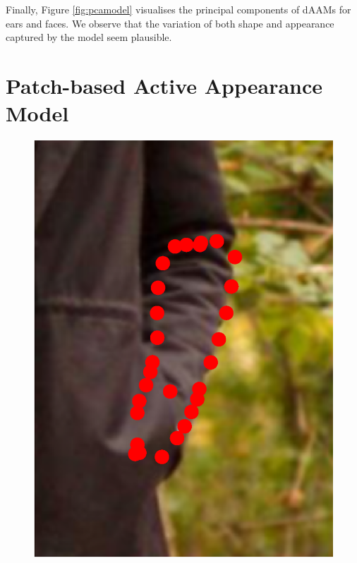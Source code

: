 Finally, Figure \ref{fig:pcamodel} visualises the principal components of dAAMs for ears and faces. We observe that the variation of both shape and appearance captured by the model seem plausible.














\section{Patch-based Active Appearance Model}
\label{sec:paam}


\begin{figure}[!t]
    \newcommand{\ofh}{0.24\columnwidth}
    \centering
    \includegraphics[height=\ofh]{Suplementory_Meterial/ExFit/0001.eps}

\end{figure}
